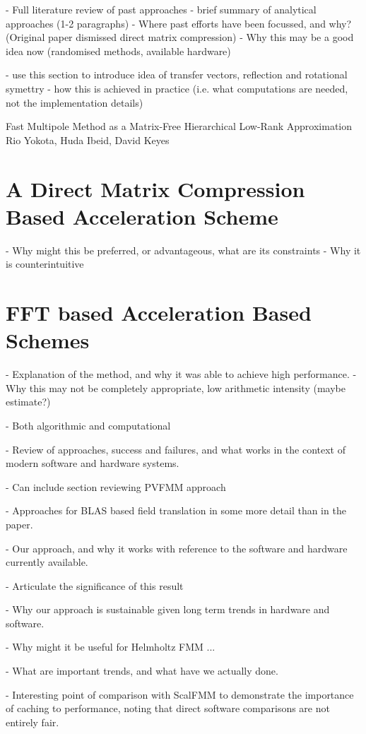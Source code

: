 - Full literature review of past approaches
- brief summary of analytical approaches (1-2 paragraphs)
- Where past efforts have been focussed, and why? (Original paper dismissed direct matrix compression)
- Why this may be a good idea now (randomised methods, available hardware)

- use this section to introduce idea of transfer vectors, reflection and rotational symettry
- how this is achieved in practice (i.e. what computations are needed, not the implementation details)

Fast Multipole Method as a Matrix-Free Hierarchical Low-Rank Approximation
Rio Yokota, Huda Ibeid, David Keyes


\section{A Direct Matrix Compression Based Acceleration Scheme}

- Why might this be preferred, or advantageous, what are its constraints
- Why it is counterintuitive


\section{FFT based Acceleration Based Schemes}

- Explanation of the method, and why it was able to achieve high performance.
- Why this may not be completely appropriate, low arithmetic intensity (maybe estimate?)


- Both algorithmic and computational

- Review of approaches, success and failures, and what works in the context of modern software and hardware systems.

- Can include section reviewing PVFMM approach

- Approaches for BLAS based field translation in some more detail than in the paper.

- Our approach, and why it works with reference to the software and hardware currently available.

- Articulate the significance of this result

- Why our approach is sustainable given long term trends in hardware and software.

- Why might it be useful for Helmholtz FMM ...

- What are important trends, and what have we actually done.

- Interesting point of comparison with ScalFMM to demonstrate the importance of caching to performance, noting that direct software comparisons are not entirely fair.

